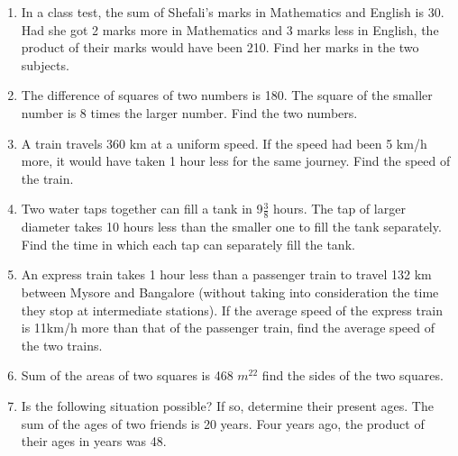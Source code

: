 \begin{enumerate}[label=\thesubsection.\arabic*,ref=\thesubsection.\theenumi]
\item In a class test, the sum of Shefali’s marks in Mathematics and English is 30. Had she got 2 marks more in Mathematics and 3 marks less in English, the product of their marks would have been 210. Find her marks in the two subjects.
\item The difference of squares of two numbers is 180. The square of the smaller number is 8 times the larger number. Find the two numbers.
\item A train travels 360 km at a uniform speed. If the speed had been 5 km/h more, it would have taken 1 hour less for the same journey. Find the speed of the train.
\item Two water taps together can fill a tank in 9$\frac{3}{ 8}$
hours. The tap of larger diameter takes 10
hours less than the smaller one to fill the tank separately. Find the time in which each tap can separately fill the tank.
\item An express train takes 1 hour less than a passenger train to travel 132 km between Mysore and Bangalore (without taking into consideration the time they stop at intermediate stations). If the average speed of the express train is 11km/h more than that of the passenger train, find the average speed of the two trains.
\item Sum of the areas of two squares is 468 $m^22$ find the sides of the two squares.
\item Is the following situation possible? If so, determine their present ages. The sum of the ages of two friends is 20 years. Four years ago, the product of their ages in years was 48.
%
\end{enumerate}
